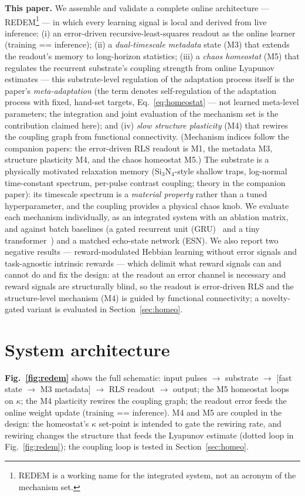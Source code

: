 \documentclass[11pt]{article}
\begin{document}
\textbf{This paper.} We assemble and validate a complete online architecture ---
REDEM\footnote{REDEM is a working name for the integrated system, not an
acronym of the mechanism set.} --- in which every learning signal is local and
derived from live
inference: (i) an error-driven recursive-least-squares readout as the online
learner (training == inference); (ii) a \emph{dual-timescale metadata} state
(M3) that extends the readout's memory to long-horizon statistics; (iii) a
\emph{chaos homeostat} (M5) that regulates the recurrent substrate's coupling
strength from online Lyapunov estimates --- this substrate-level
regulation of the adaptation process itself is the paper's
\emph{meta-adaptation} (the term denotes self-regulation of the adaptation
process with fixed, hand-set targets, Eq.~\ref{eq:homeostat} --- not learned
meta-level parameters; the integration and joint evaluation of the mechanism
set is the contribution claimed here); and (iv) \emph{slow structure
plasticity} (M4) that rewires the coupling graph from functional connectivity.
(Mechanism indices follow the companion papers: the error-driven RLS
readout is M1, the metadata M3, structure plasticity M4, and the chaos
homeostat M5.)
The substrate is a physically motivated relaxation memory (Si$_3$N$_4$-style
shallow traps, log-normal time-constant spectrum, per-pulse contrast coupling;
theory in the companion paper): its timescale spectrum is a \emph{material
property} rather than a tuned hyperparameter, and the coupling provides a
physical chaos knob. We evaluate each mechanism individually, as an integrated
system with an ablation matrix, and against batch baselines (a gated
recurrent unit (GRU)~\cite{cho2014} and a tiny transformer~\cite{vaswani2017})
and a matched echo-state network
(ESN). We also report two negative
results --- reward-modulated Hebbian learning without error signals and
task-agnostic intrinsic rewards --- which delimit what reward signals can and
cannot do and fix the design: at the readout an error channel is necessary and
reward signals are structurally blind, so the readout is error-driven RLS and
the structure-level mechanism (M4) is guided by functional connectivity; a
novelty-gated variant is evaluated in Section~\ref{sec:homeo}.

\section{System architecture}
\label{sec:architecture}

\textbf{Fig.~\ref{fig:redem}} shows the full schematic: input pulses
$\rightarrow$ substrate $\rightarrow$ [fast state $\rightarrow$ M3 metadata]
$\rightarrow$ RLS readout $\rightarrow$ output; the M5 homeostat loops on
$\kappa$; the M4 plasticity rewires the coupling graph; the readout error feeds
the online weight update (training == inference). M4 and M5 are coupled in
the design: the homeostat's $\kappa$ set-point is intended to gate the
rewiring rate, and rewiring changes the structure that feeds the Lyapunov
estimate (dotted loop in Fig.~\ref{fig:redem}); the coupling loop is tested
in Section~\ref{sec:homeo}.
\end{document}
